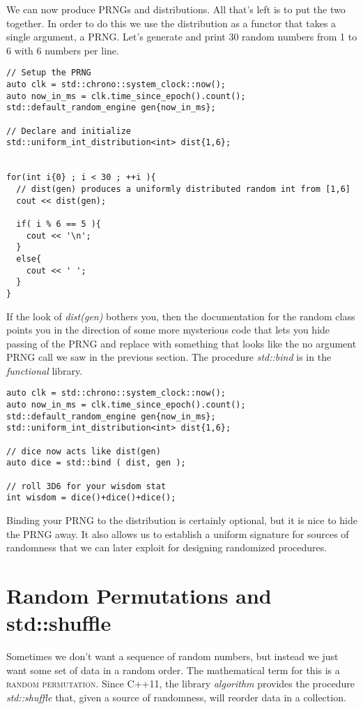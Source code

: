 \documentclass[]{tufte-handout}
\begin{document}
We can now produce PRNGs and distributions. All that's left is to put the two together. In order to do this we use the distribution as a functor that takes a single argument, a PRNG.  Let's generate and print 30 random numbers from 1 to 6 with 6 numbers per line.
\begin{verbatim}
// Setup the PRNG
auto clk = std::chrono::system_clock::now();
auto now_in_ms = clk.time_since_epoch().count();
std::default_random_engine gen{now_in_ms};    

// Declare and initialize 
std::uniform_int_distribution<int> dist{1,6};


for(int i{0} ; i < 30 ; ++i ){
  // dist(gen) produces a uniformly distributed random int from [1,6]	
  cout << dist(gen);

  if( i % 6 == 5 ){
    cout << '\n';
  } 
  else{
    cout << ' ';
  }
}
\end{verbatim}

If the look of \textit{dist(gen)} bothers you, then the documentation for the random class points you in the direction of some more mysterious code that lets you hide passing of the PRNG and replace  with something that looks like the no argument PRNG call we saw in the previous section.  The procedure \textit{std::bind} is in the \textit{functional} library.
\begin{verbatim}
auto clk = std::chrono::system_clock::now();
auto now_in_ms = clk.time_since_epoch().count();
std::default_random_engine gen{now_in_ms};    
std::uniform_int_distribution<int> dist{1,6};

// dice now acts like dist(gen)
auto dice = std::bind ( dist, gen );

// roll 3D6 for your wisdom stat
int wisdom = dice()+dice()+dice();
\end{verbatim}
Binding your PRNG to the distribution is certainly optional, but it is nice to hide the PRNG away. It also allows us to establish a uniform signature for sources of randomness that we can later exploit for designing randomized procedures.

\section{Random Permutations and std::shuffle}

Sometimes we don't want a sequence of random numbers, but instead we just want some set of data in a random order. The mathematical term for this is a \textsc{random permutation}. Since C++11, the library \textit{algorithm} provides the procedure \textit{std::shuffle} that, given a source of randomness, will reorder data in a collection. 
\end{document}
